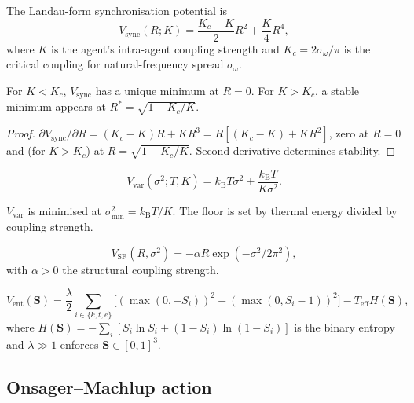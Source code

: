 \documentclass[11pt,twocolumn,a4paper]{article}
\newcommand{\Svec}{\mathbf{S}}
\newcommand{\kB}{k_{\mathrm{B}}}
\newcommand{\Kc}{K_c}
\begin{document}
\begin{definition}\label{def:vsync}
The Landau-form synchronisation potential is
\[
V_{\mathrm{sync}}(R;K)=\frac{\Kc-K}{2}R^2+\frac{K}{4}R^4,
\]
where $K$ is the agent's intra-agent coupling strength and
$\Kc=2\sigma_\omega/\pi$ is the critical coupling for natural-frequency
spread $\sigma_\omega$.
\end{definition}

\begin{proposition}[Bifurcation at $K=\Kc$]\label{prop:bif}
For $K<\Kc$, $V_{\mathrm{sync}}$ has a unique minimum at $R=0$. For
$K>\Kc$, a stable minimum appears at $R^*=\sqrt{1-\Kc/K}$.
\end{proposition}

\begin{proof}
$\partial V_{\mathrm{sync}}/\partial R=(\Kc-K)R+KR^3=R[(\Kc-K)+KR^2]$,
zero at $R=0$ and (for $K>\Kc$) at $R=\sqrt{1-\Kc/K}$. Second
derivative determines stability.
\end{proof}

\begin{definition}\label{def:vvar}
\[
V_{\mathrm{var}}(\sigma^2;T,K)=\kB T\sigma^2+\frac{\kB T}{K\sigma^2}.
\]
\end{definition}

\begin{proposition}\label{prop:varfloor}
$V_{\mathrm{var}}$ is minimised at $\sigma^2_{\min}=\kB T/K$. The
floor is set by thermal energy divided by coupling strength.
\end{proposition}

\begin{definition}\label{def:vsf}
\[
V_{\mathrm{SF}}(R,\sigma^2)=-\alpha R\exp(-\sigma^2/2\pi^2),
\]
with $\alpha>0$ the structural coupling strength.
\end{definition}

\begin{definition}\label{def:vent}
\[
V_{\mathrm{ent}}(\Svec)=\frac{\lambda}{2}\sum_{i\in\{k,t,e\}}\bigl[
(\max(0,-S_i))^2+(\max(0,S_i-1))^2\bigr]-T_{\mathrm{eff}}H(\Svec),
\]
where $H(\Svec)=-\sum_i[S_i\ln S_i+(1-S_i)\ln(1-S_i)]$ is the binary
entropy and $\lambda\gg 1$ enforces $\Svec\in[0,1]^3$.
\end{definition}

\subsection{Onsager--Machlup action}
\end{document}
